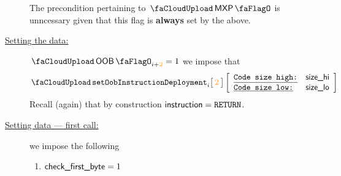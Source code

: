 \begin{description}
		\saNote{} The precondition pertaining to $\miscMxpFlag$ is unncessary given that this flag is \textbf{always} set by the above.
	\item[\underline{Setting the \oobMod{} data:}]
		\If $\miscOobFlag _{i + \locFirstMiscRowOffset} = 1$ \Then we impose that
		\[
			\setOobInstructionDeployment
			{i}{\locFirstMiscRowOffset}
			\left[ \begin{array}{ll}
				\utt{Code size high:} & \locSizeHi \\
				\utt{Code size low:}  & \locSizeLo \\
			\end{array} \right]
		\]
		\saNote{} Recall (again) that by construction $\textsf{instruction} = \texttt{RETURN}$.
	\item[\underline{Setting \mmuMod{} data --- first call:}]
		we impose the following
		\begin{enumerate}
			\item \If $\textsf{check\_first\_byte} = 1$

\end{enumerate}
\end{description}
